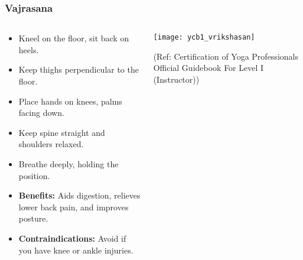 \begin{frame}[fragile]\frametitle{Vajrasana}
\begin{columns}
    \begin{column}[T]{0.5\linewidth}
      \begin{itemize}
        \item Kneel on the floor, sit back on heels.
        \item Keep thighs perpendicular to the floor.
        \item Place hands on knees, palms facing down.
        \item Keep spine straight and shoulders relaxed.
        \item Breathe deeply, holding the position.
        \item \textbf{Benefits:} Aids digestion, relieves lower back pain, and improves posture.
        \item \textbf{Contraindications:} Avoid if you have knee or ankle injuries.
      \end{itemize}
    \end{column}
    \begin{column}[T]{0.5\linewidth}
        \begin{center}
        \begin{center}
		        \texttt{[image: ycb1\_vrikshasan]}
				
				{\tiny (Ref: Certification  of Yoga Professionals Official Guidebook For Level I (Instructor))}	        
		\end{center}   
        \end{center}    
    \end{column}
  \end{columns}
\end{frame}


